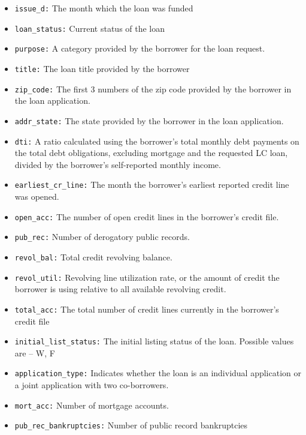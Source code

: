 \documentclass[
  letterpaper,
  DIV=11,
  numbers=noendperiod]{scrartcl}
\begin{document}
\begin{itemize}
  \texttt{verification\_status:} Indicates if income was verified by LC,
  not verified, or if the income source was verified\\
\item
  \texttt{issue\_d:} The month which the loan was funded\\
\item
  \texttt{loan\_status:} Current status of the loan\\
\item
  \texttt{purpose:} A category provided by the borrower for the loan
  request.\\
\item
  \texttt{title:} The loan title provided by the borrower\\
\item
  \texttt{zip\_code:} The first 3 numbers of the zip code provided by
  the borrower in the loan application.\\
\item
  \texttt{addr\_state:} The state provided by the borrower in the loan
  application.\\
\item
  \texttt{dti:} A ratio calculated using the borrower's total monthly
  debt payments on the total debt obligations, excluding mortgage and
  the requested LC loan, divided by the borrower's self-reported monthly
  income.\\
\item
  \texttt{earliest\_cr\_line:} The month the borrower's earliest
  reported credit line was opened.\\
\item
  \texttt{open\_acc:} The number of open credit lines in the borrower's
  credit file.\\
\item
  \texttt{pub\_rec:} Number of derogatory public records.\\
\item
  \texttt{revol\_bal:} Total credit revolving balance.\\
\item
  \texttt{revol\_util:} Revolving line utilization rate, or the amount
  of credit the borrower is using relative to all available revolving
  credit.\\
\item
  \texttt{total\_acc:} The total number of credit lines currently in the
  borrower's credit file
\item
  \texttt{initial\_list\_status:} The initial listing status of the
  loan. Possible values are -- W, F
\item
  \texttt{application\_type:} Indicates whether the loan is an
  individual application or a joint application with two co-borrowers.\\
\item
  \texttt{mort\_acc:} Number of mortgage accounts.\\
\item
  \texttt{pub\_rec\_bankruptcies:} Number of public record bankruptcies
\end{itemize}
\end{document}
